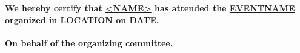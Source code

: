 \documentclass[16pt,a4paper]{scrartcl}              %
\begin{document}
%			
		
		\vfill
		\doublespacing
		{\bfseries We hereby certify that {\underline{<NAME>}} has attended the {\underline{EVENTNAME}} organized in {\underline{LOCATION}} on {\underline{DATE}}. 
		\\~\\
			On behalf of the organizing committee,				
		}
\end{document}
